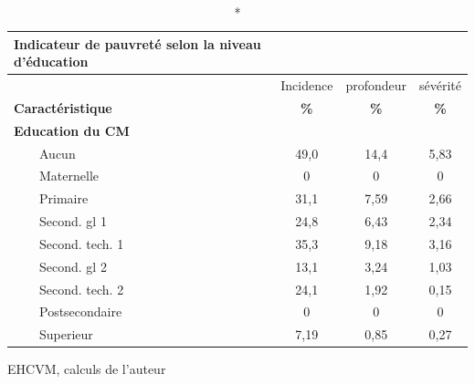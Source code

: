 \documentclass[
]{article}
\begin{document}
\setlength{\LTpost}{0mm}
\begin{longtable}{lccc}
\caption*{
{\large \textbf{Indicateur de pauvreté selon la niveau
d'éducation}}
} \\ 
\toprule
 & Incidence & profondeur & sévérité \\ 
\cmidrule(lr){2-2} \cmidrule(lr){3-3} \cmidrule(lr){4-4}
\textbf{Caractéristique} & \textbf{\%} & \textbf{\%} & \textbf{\%} \\ 
\midrule\addlinespace[2.5pt]
\textbf{Education du CM} &  &  &  \\ 
    Aucun & 49,0 & 14,4 & 5,83 \\ 
    Maternelle & 0 & 0 & 0 \\ 
    Primaire & 31,1 & 7,59 & 2,66 \\ 
    Second. gl 1 & 24,8 & 6,43 & 2,34 \\ 
    Second. tech. 1 & 35,3 & 9,18 & 3,16 \\ 
    Second. gl 2 & 13,1 & 3,24 & 1,03 \\ 
    Second. tech. 2 & 24,1 & 1,92 & 0,15 \\ 
    Postsecondaire & 0 & 0 & 0 \\ 
    Superieur & 7,19 & 0,85 & 0,27 \\ 
\bottomrule
\end{longtable}
\begin{minipage}{\linewidth}
EHCVM, calculs de l'auteur\\
\end{minipage}
\end{document}
